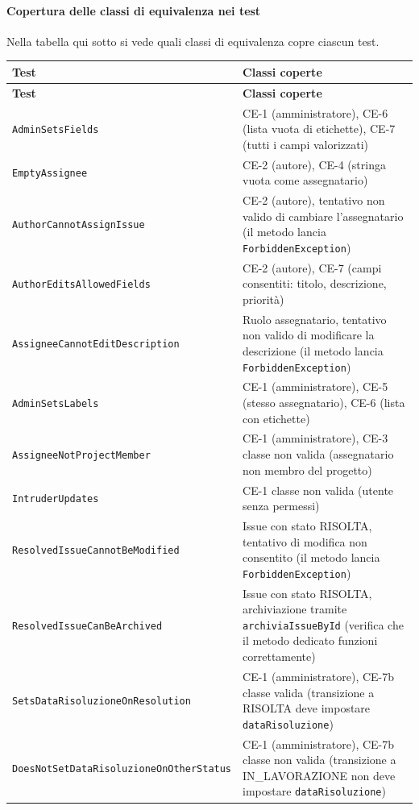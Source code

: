 \paragraph{Copertura delle classi di equivalenza nei test}

Nella tabella qui sotto si vede quali classi di equivalenza copre ciascun test.

\begin{longtable}{|p{6cm}|p{8.5cm}|}
\hline
\textbf{Test} & \textbf{Classi coperte} \\
\hline
\endfirsthead
\hline
\textbf{Test} & \textbf{Classi coperte} \\
\hline
\endhead
\texttt{AdminSetsFields} &
CE-1 (amministratore), CE-6 (lista vuota di etichette), CE-7 (tutti i campi valorizzati) \\
\hline
\texttt{EmptyAssignee} &
CE-2 (autore), CE-4 (stringa vuota come assegnatario) \\
\hline
\texttt{AuthorCannotAssignIssue} &
CE-2 (autore), tentativo non valido di cambiare l'assegnatario (il metodo lancia \texttt{ForbiddenException}) \\
\hline
\texttt{AuthorEditsAllowedFields} &
CE-2 (autore), CE-7 (campi consentiti: titolo, descrizione, priorit\`a) \\
\hline
\texttt{AssigneeCannotEditDescription} &
Ruolo assegnatario, tentativo non valido di modificare la descrizione (il metodo lancia \texttt{ForbiddenException}) \\
\hline
\texttt{AdminSetsLabels} &
CE-1 (amministratore), CE-5 (stesso assegnatario), CE-6 (lista con etichette) \\
\hline
\texttt{AssigneeNotProjectMember} &
CE-1 (amministratore), CE-3 classe non valida (assegnatario non membro del progetto) \\
\hline
\texttt{IntruderUpdates} &
CE-1 classe non valida (utente senza permessi) \\
\hline
\texttt{ResolvedIssueCannotBeModified} &
Issue con stato RISOLTA, tentativo di modifica non consentito (il metodo lancia \texttt{ForbiddenException}) \\
\hline
\texttt{ResolvedIssueCanBeArchived} &
Issue con stato RISOLTA, archiviazione tramite \texttt{archiviaIssueById} (verifica che il metodo dedicato funzioni correttamente) \\
\hline
\texttt{SetsDataRisoluzioneOnResolution} &
CE-1 (amministratore), CE-7b classe valida (transizione a RISOLTA deve impostare \texttt{dataRisoluzione}) \\
\hline
\texttt{DoesNotSetDataRisoluzioneOnOtherStatus} &
CE-1 (amministratore), CE-7b classe non valida (transizione a IN\_LAVORAZIONE non deve impostare \texttt{dataRisoluzione}) \\
\hline
\end{longtable}

